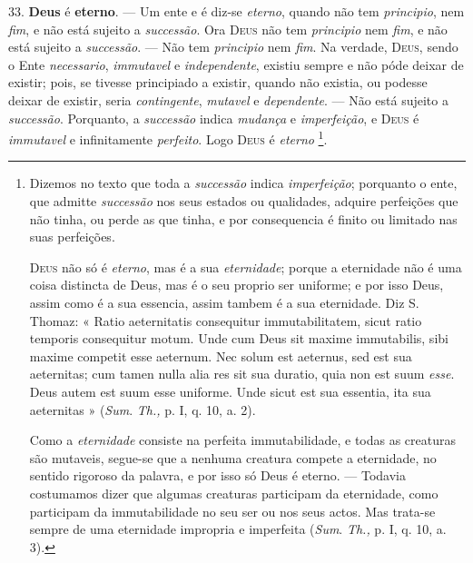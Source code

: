  33. \textbf{Deus} é \textbf{eterno}. --- Um ente e é diz-se \emph{eterno}, quando não tem \emph{principio}, nem \emph{fim}, e não está sujeito a \emph{successão}. Ora \textsc{Deus} não tem \emph{principio} nem \emph{fim}, e não está sujeito a \emph{successão}. --- Não tem \emph{principio} nem \emph{fim}. Na verdade, \textsc{Deus}, sendo o Ente \emph{necessario}, \emph{immutavel} e \emph{independente}, existiu sempre e não póde deixar de existir; pois, se tivesse principiado a existir, quando não existia, ou podesse deixar de existir, seria \emph{contingente}, \emph{mutavel} e \emph{dependente}. --- Não está sujeito a \emph{successão}. Porquanto, a \emph{successão} indica \emph{mudança} e \emph{imperfeição}, e \textsc{Deus} é \emph{immutavel} e infinitamente \emph{perfeito}. Logo \textsc{Deus} é \emph{eterno} \footnote{Dizemos no texto que toda a \emph{successão} indica \emph{imperfeição}; porquanto o ente, que admitte \emph{successão} nos seus estados ou qualidades, adquire perfeições que não tinha, ou perde as que tinha, e por consequencia é finito ou limitado nas suas perfeições.\par \textsc{Deus} não só é \emph{eterno}, mas é a sua \emph{eternidade}; porque a eternidade não é uma coisa distincta de Deus, mas é o seu proprio ser uniforme; e por isso Deus, assim como é a sua essencia, assim tambem é a sua eternidade. Diz S. Thomaz: « Ratio aeternitatis consequitur immutabilitatem, sicut ratio temporis consequitur motum. Unde cum Deus sit maxime immutabilis, sibi maxime competit esse aeternum. Nec solum est aeternus, sed est sua aeternitas; cum tamen nulla alia res sit sua duratio, quia non est suum \emph{esse}. Deus autem est suum esse uniforme. Unde sicut est sua essentia, ita sua aeternitas » (\emph{Sum}. \emph{Th.,} p. I, q. 10, a. 2).\par Como a \emph{eternidade} consiste na perfeita immutabilidade, e todas as creaturas são mutaveis, segue-se que a nenhuma creatura compete a eternidade, no sentido rigoroso da palavra, e por isso só Deus é eterno. --- Todavia costumamos dizer que algumas creaturas participam da eternidade, como participam da immutabilidade no seu ser ou nos seus actos. Mas trata-se sempre de uma eternidade impropria e imperfeita (\emph{Sum}. \emph{Th.,} p. I, q. 10, a. 3).}.

